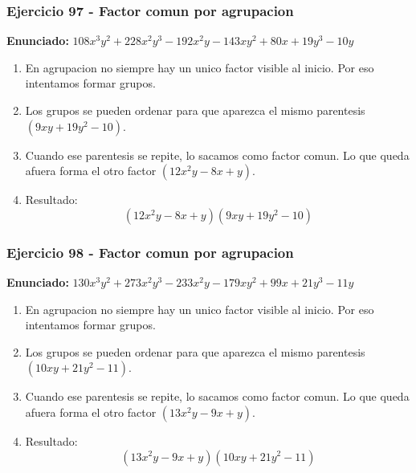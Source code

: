 \documentclass[11pt,a4paper]{article}
\begin{document}
\subsubsection*{Ejercicio 97 - Factor comun por agrupacion}
\textbf{Enunciado:} $ 108 x^{3} y^{2} + 228 x^{2} y^{3} - 192 x^{2} y - 143 x y^{2} + 80 x + 19 y^{3} - 10 y $\par
\begin{enumerate}[leftmargin=2em]
\item En agrupacion no siempre hay un unico factor visible al inicio. Por eso intentamos formar grupos.
\item Los grupos se pueden ordenar para que aparezca el mismo parentesis \((9 x y + 19 y^{2} - 10)\).
\item Cuando ese parentesis se repite, lo sacamos como factor comun. Lo que queda afuera forma el otro factor \((12 x^{2} y - 8 x + y)\).
\item Resultado: \[\boxed{\left(12 x^{2} y - 8 x + y\right)\left(9 x y + 19 y^{2} - 10\right)}\]
\end{enumerate}

\vspace{0.2cm}
\subsubsection*{Ejercicio 98 - Factor comun por agrupacion}
\textbf{Enunciado:} $ 130 x^{3} y^{2} + 273 x^{2} y^{3} - 233 x^{2} y - 179 x y^{2} + 99 x + 21 y^{3} - 11 y $\par
\begin{enumerate}[leftmargin=2em]
\item En agrupacion no siempre hay un unico factor visible al inicio. Por eso intentamos formar grupos.
\item Los grupos se pueden ordenar para que aparezca el mismo parentesis \((10 x y + 21 y^{2} - 11)\).
\item Cuando ese parentesis se repite, lo sacamos como factor comun. Lo que queda afuera forma el otro factor \((13 x^{2} y - 9 x + y)\).
\item Resultado: \[\boxed{\left(13 x^{2} y - 9 x + y\right)\left(10 x y + 21 y^{2} - 11\right)}\]
\end{enumerate}

\vspace{0.2cm}
\end{document}
